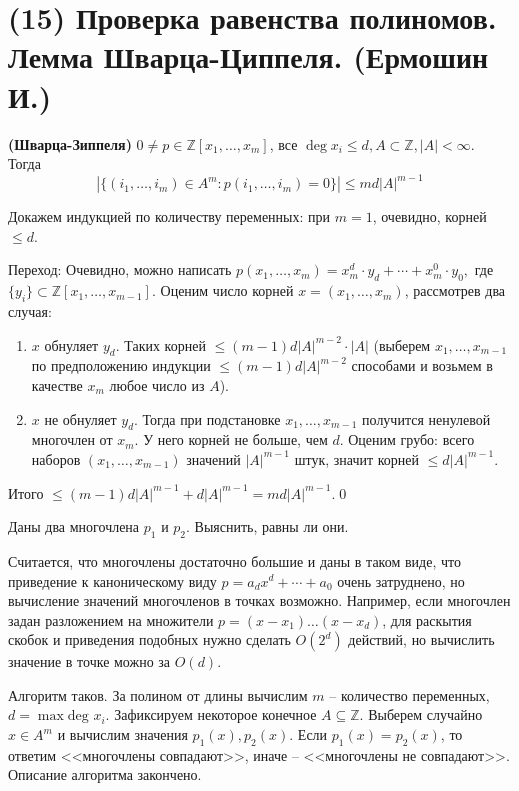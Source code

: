 \section{(15) Проверка равенства полиномов. Лемма Шварца-Циппеля. (Ермошин И.)}

\begin{lemma*}{\bf(Шварца-Зиппеля)}
	$0\ne p\in\mathbb{Z}[x_1,\ldots,x_m]$, все $\deg x_i\le d, A\subset\mathbb{Z}, |A|<\infty$. Тогда $$\left|\{(i_1,\ldots,i_m)\in A^m\colon p(i_1,\ldots,i_m)=0\}\right|\le md|A|^{m-1}$$
\end{lemma*}
Докажем индукцией по количеству переменных: при $m=1$, очевидно, корней $\le d$.

Переход: 
Очевидно, можно написать $p(x_1,\ldots,x_m)=x_m^d\cdot y_d+\cdots+x_m^0\cdot y_0,$ где $\{y_i\}\subset \mathbb Z[x_1,\ldots,x_{m-1}]$. Оценим число корней $x = (x_1, \ldots, x_m)$, рассмотрев два случая:
\begin{enumerate}
\item $x$ обнуляет $y_d$. Таких корней $\le (m-1)d|A|^{m-2} \cdot |A|$ (выберем $x_1,\ldots,x_{m-1}$ по предположению индукции $\le(m-1)d|A|^{m-2}$ способами и возьмем в качестве $x_m$ любое число из $A$).
\item $x$ не обнуляет $y_d$. Тогда при подстановке $x_1, \ldots, x_{m-1}$ получится ненулевой многочлен от $x_m$. У него корней не больше, чем $d$. Оценим грубо: всего наборов $(x_1, \ldots, x_{m-1})$ значений $|A|^{m-1}$ штук, значит корней $\le d|A|^{m-1}$.
\end{enumerate}

Итого $\le (m-1)d|A|^{m-1}+d|A|^{m-1}=md|A|^{m-1}.$\qed

\begin{problem*}
	Даны два многочлена $p_1$ и $p_2$. Выяснить, равны ли они.
\end{problem*}

Считается, что многочлены достаточно большие и даны в таком виде, что приведение к каноническому виду $p = a_d x^d + \cdots + a_0$ очень затруднено, но вычисление значений многочленов в точках возможно. Например, если многочлен задан разложением на множители $p = (x-x_1)\ldots(x-x_d)$, для раскытия скобок и приведения подобных нужно сделать $O(2^d)$ действий, но вычислить значение в точке можно за $O(d)$.

Алгоритм таков. За полином от длины вычислим $m$ -- количество переменных, $d = \max\text{deg } x_i$. Зафиксируем некоторое конечное $A \subseteq \mathbb Z$. Выберем случайно $x \in A^m$ и вычислим значения $p_1(x), p_2(x)$. Если $p_1(x) = p_2(x)$, то ответим <<многочлены совпадают>>, иначе -- <<многочлены не совпадают>>. Описание алгоритма закончено.

